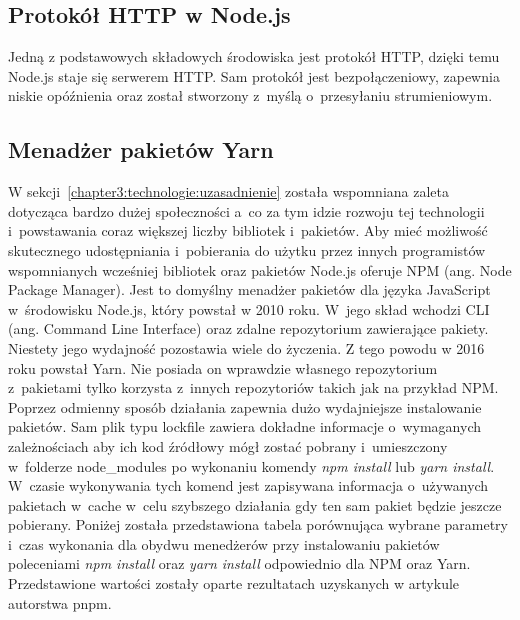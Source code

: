\documentclass[../Kamil_Kowalewski_Main.tex]{subfiles}
\begin{document}
{{        \subsection{Protokół HTTP w Node.js}
        \label{chapter3:technologie:node:http_node} {
            Jedną z podstawowych składowych środowiska jest protokół HTTP\cite{website:http},
            dzięki temu Node.js staje się serwerem HTTP. Sam protokół jest bezpołączeniowy,
            zapewnia niskie opóźnienia oraz został stworzony z~myślą o~przesyłaniu
            strumieniowym.
        }

        \subsection{Menadżer pakietów Yarn}
        \label{chapter3:technologie:node:yarn} {
            W sekcji~\ref{chapter3:technologie:uzasadnienie} została wspomniana zaleta
            dotycząca bardzo dużej społeczności a~co za tym idzie rozwoju tej
            technologii i~powstawania coraz większej liczby bibliotek i~pakietów. Aby
            mieć możliwość skutecznego udostępniania i~pobierania do użytku przez
            innych programistów wspomnianych wcześniej bibliotek oraz pakietów Node.js
            oferuje NPM\cite{website:npm} (ang. Node Package Manager).
            Jest to domyślny menadżer pakietów dla języka JavaScript
            w~środowisku Node.js, który powstał w 2010 roku. W~jego skład wchodzi CLI
            (ang. Command Line Interface) oraz zdalne repozytorium zawierające pakiety.
            Niestety jego wydajność pozostawia wiele do życzenia. Z tego powodu w 2016
            roku powstał Yarn\cite{website:yarn}. Nie posiada on wprawdzie własnego
            repozytorium z~pakietami tylko korzysta z~innych repozytoriów takich jak
            na przykład NPM. Poprzez odmienny sposób działania zapewnia dużo
            wydajniejsze instalowanie pakietów. Sam plik typu lockfile zawiera dokładne
            informacje o~wymaganych zależnościach aby ich kod źródłowy mógł zostać pobrany
            i~umieszczony w~folderze node\_modules po wykonaniu komendy \textit{npm install} lub
            \textit{yarn install}. W~czasie wykonywania tych komend jest zapisywana informacja
            o~używanych pakietach w~cache w~celu szybszego działania gdy ten sam pakiet będzie
            jeszcze pobierany. Poniżej została przedstawiona tabela
            porównująca wybrane parametry i~czas wykonania dla obydwu menedżerów przy
            instalowaniu pakietów poleceniami \textit{npm install} oraz \textit{yarn install}
            odpowiednio dla NPM oraz Yarn. Przedstawione wartości zostały oparte
            rezultatach uzyskanych w artykule autorstwa
            pnpm\cite{website:npmvsyarn-pnpmbenchmark}.

}}}
\end{document}
